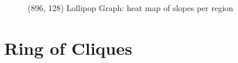 \begin{figure}
    \centering
    \caption{(896, 128) Lollipop Graph: heat map of slopes per region}
    \label{fig:896x128lollipopslopes}
\end{figure}

\section{Ring of Cliques}\label{sec:ringofcliques}
